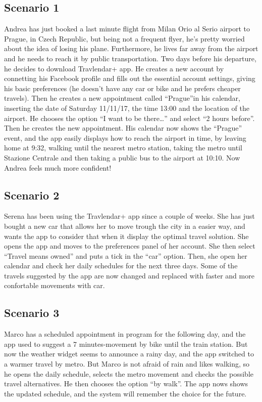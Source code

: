 \subsection{Scenario 1}
Andrea has just booked a last minute flight from Milan Orio al Serio airport to Prague, in Czech Republic, but being not a frequent flyer, he’s pretty worried about the idea of losing his plane. Furthermore, he lives far away from the airport and he needs to reach it by public transportation. Two days before his departure, he decides to download Travlendar+ app. He creates a new account by connetting his Facebook profile and fills out the essential account settings, giving his basic preferences (he doesn’t have any car or bike and he prefers cheaper travels). Then he creates a new appointment called “Prague”in his calendar, inserting the date of Saturday 11/11/17, the time 13:00 and the location of the airport. He chooses the option “I want to be there…” and select “2 hours before”. Then he creates the new appointment. His calendar now shows the “Prague” event, and the app easily displays how to reach the airport in time, by leaving home at 9:32, walking until the nearest metro station, taking the metro until Stazione Centrale and then taking a public bus to the airport at 10:10. Now Andrea feels much more confident!
\subsection{Scenario 2}
Serena has been using the Travlendar+ app since a couple of weeks. She has just bought a new car that allows her to move trough the city in a easier way, and wants the app to consider that when it display the optimal travel solution. She opens the app and moves to the preferences panel of her account. She then select “Travel means owned” and puts a tick in the “car” option. Then, she open her calendar and check her daily schedules for the next three days. Some of the travels suggested by the app are now changed and replaced with faster and more confortable movements with car.
\subsection{Scenario 3}
Marco has a scheduled appointment in program for the following day, and the app used to suggest a 7 minutes-movement by bike until the train station. But now the weather widget seems to announce a rainy day, and the app switched to a warmer travel by metro. But Marco is not afraid of rain and likes walking, so he opens the daily schedule, selects the metro movement and checks the possible travel alternatives. He then chooses the option “by walk”. The app nows shows the updated schedule, and the system will remember the choice for the future.
